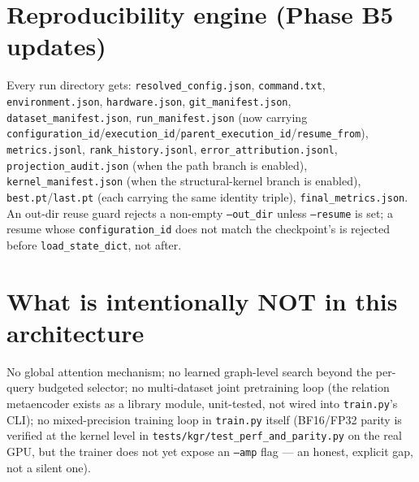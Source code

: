\documentclass[11pt]{article}
\begin{document}
\section{Reproducibility engine (Phase B5 updates)}
Every run directory gets: \texttt{resolved\_config.json}, \texttt{command.txt},
\texttt{environment.json}, \texttt{hardware.json}, \texttt{git\_manifest.json},
\texttt{dataset\_manifest.json}, \texttt{run\_manifest.json} (now carrying
\texttt{configuration\_id}/\texttt{execution\_id}/\texttt{parent\_execution\_id}/\texttt{resume\_from}),
\texttt{metrics.jsonl}, \texttt{rank\_history.jsonl}, \texttt{error\_attribution.jsonl},
\texttt{projection\_audit.json} (when the path branch is enabled), \texttt{kernel\_manifest.json}
(when the structural-kernel branch is enabled), \texttt{best.pt}/\texttt{last.pt} (each carrying
the same identity triple), \texttt{final\_metrics.json}. An out-dir reuse guard rejects a
non-empty \texttt{--out\_dir} unless \texttt{--resume} is set; a resume whose
\texttt{configuration\_id} does not match the checkpoint's is rejected before
\texttt{load\_state\_dict}, not after.

\section{What is intentionally NOT in this architecture}
No global attention mechanism; no learned graph-level search beyond the per-query budgeted
selector; no multi-dataset joint pretraining loop (the relation metaencoder exists as a library
module, unit-tested, not wired into \texttt{train.py}'s CLI); no mixed-precision training loop in
\texttt{train.py} itself (BF16/FP32 parity is verified at the kernel level in
\texttt{tests/kgr/test\_perf\_and\_parity.py} on the real GPU, but the trainer does not yet expose
an \texttt{--amp} flag --- an honest, explicit gap, not a silent one).
\end{document}
